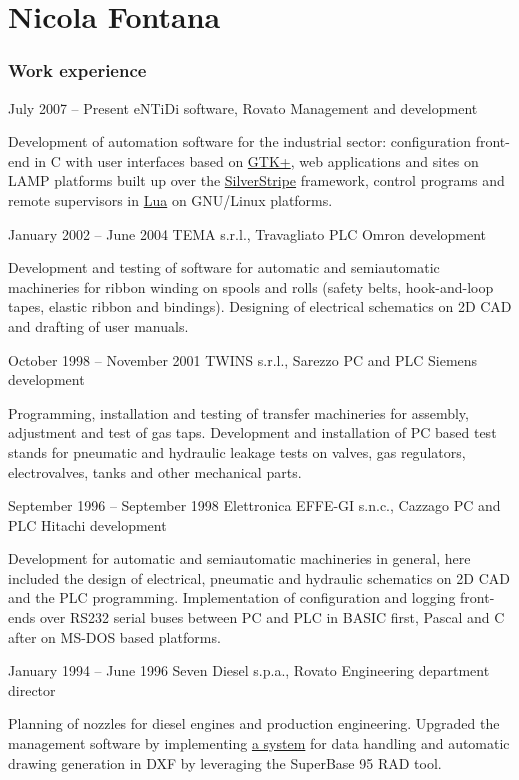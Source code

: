 \documentclass[fontsize=10pt]{tccv}
\begin{document}
\part{Nicola Fontana}

\section{Work experience}

\begin{eventlist}

\item{July 2007 -- Present}
     {eNTiDi software, Rovato}
     {Management and development}

Development of automation software for the industrial sector:
configuration front-end in C with user interfaces based on
\href{http://www.gtk.org/}{GTK+}, web applications and sites
on LAMP platforms built up over the
\href{http://www.silverstripe.org/}{SilverStripe} framework,
control programs and remote supervisors in
\href{http://www.lua.org/}{Lua} on GNU/Linux platforms.

\item{January 2002 -- June 2004}
     {TEMA s.r.l., Travagliato}
     {PLC Omron development}

Development and testing of software for automatic and semiautomatic
machineries for ribbon winding on spools and rolls (safety belts,
hook-and-loop tapes, elastic ribbon and bindings). Designing of
electrical schematics on 2D CAD and drafting of user manuals.

\item{October 1998 -- November 2001}
     {TWINS s.r.l., Sarezzo}
     {PC and PLC Siemens development}

Programming, installation and testing of transfer machineries for
assembly, adjustment and test of gas taps. Development and installation
of PC based test stands for pneumatic and hydraulic leakage tests on
valves, gas regulators, electrovalves, tanks and other mechanical parts.

\item{September 1996 -- September 1998}
     {Elettronica EFFE-GI s.n.c., Cazzago}
     {PC and PLC Hitachi development}

Development for automatic and semiautomatic machineries in general, here
included the design of electrical, pneumatic and hydraulic schematics on
2D CAD and the PLC programming. Implementation of configuration and
logging front-ends over RS232 serial buses between PC and PLC in BASIC
first, Pascal and C after on MS-DOS based platforms.

\item{January 1994 -- June 1996}
     {Seven Diesel s.p.a., Rovato}
     {Engineering department director}

Planning of nozzles for diesel engines and production engineering.
Upgraded the management software by implementing
\href{http://adg.entidi.com/home/history/}{a system} for data handling
and automatic drawing generation in DXF by leveraging the SuperBase 95
RAD tool.

\end{eventlist}
\end{document}

